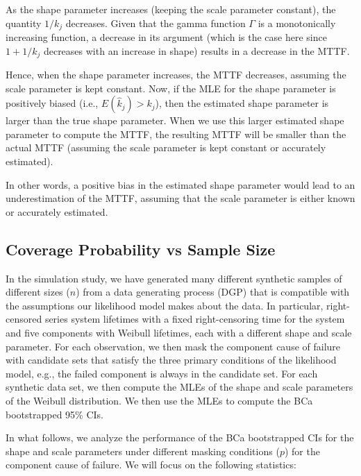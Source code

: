 \documentclass[
]{article}
\begin{document}
As the shape parameter increases (keeping the scale parameter constant),
the quantity \(1/k_j\) decreases. Given that the gamma function
\(\Gamma\) is a monotonically increasing function, a decrease in its
argument (which is the case here since \(1 + 1/k_j\) decreases with an
increase in shape) results in a decrease in the MTTF.

Hence, when the shape parameter increases, the MTTF decreases, assuming
the scale parameter is kept constant. Now, if the MLE for the shape
parameter is positively biased (i.e., \(E(\hat k_j) > k_j\)), then the
estimated shape parameter is larger than the true shape parameter. When
we use this larger estimated shape parameter to compute the MTTF, the
resulting MTTF will be smaller than the actual MTTF (assuming the scale
parameter is kept constant or accurately estimated).

In other words, a positive bias in the estimated shape parameter would
lead to an underestimation of the MTTF, assuming that the scale
parameter is either known or accurately estimated.

\hypertarget{coverage-probability-vs-sample-size}{%
\subsection{Coverage Probability vs Sample
Size}\label{coverage-probability-vs-sample-size}}

In the simulation study, we have generated many different synthetic
samples of different sizes (\(n\)) from a data generating process (DGP)
that is compatible with the assumptions our likelihood model makes about
the data. In particular, right-censored series system lifetimes with a
fixed right-censoring time for the system and five components with
Weibull lifetimes, each with a different shape and scale parameter. For
each observation, we then mask the component cause of failure with
candidate sets that satisfy the three primary conditions of the
likelihood model, e.g., the failed component is always in the candidate
set. For each synthetic data set, we then compute the MLEs of the shape
and scale parameters of the Weibull distribution. We then use the MLEs
to compute the BCa bootstrapped 95\% CIs.

In what follows, we analyze the performance of the BCa bootstrapped CIs
for the shape and scale parameters under different masking conditions
(\(p\)) for the component cause of failure. We will focus on the
following statistics:
\end{document}
